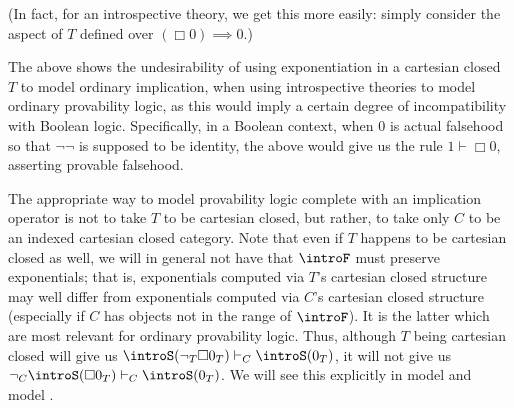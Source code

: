 (In fact, for an introspective theory, we get this more easily: simply consider the aspect of $T$ defined over $(\Box 0) \implies 0$.)

The above shows the undesirability of using exponentiation in a cartesian closed $T$ to model ordinary implication, when using introspective theories to model ordinary provability logic, as this would imply a certain degree of incompatibility with Boolean logic. Specifically, in a Boolean context, when $0$ is actual falsehood so that $\neg \neg$ is supposed to be identity, the above would give us the rule $1 \vdash \Box 0$, asserting provable falsehood.

The appropriate way to model provability logic complete with an implication operator is not to take $T$ to be cartesian closed, but rather, to take only $C$ to be an indexed cartesian closed category. Note that even if $T$ happens to be cartesian closed as well, we will in general not have that $\introF$ must preserve exponentials; that is, exponentials computed via $T$'s cartesian closed structure may well differ from exponentials computed via $C$'s cartesian closed structure (especially  if $C$ has objects not in the range of $\introF$). It is the latter which are most relevant for ordinary provability logic. Thus, although $T$ being cartesian closed will give us $\introS(\neg_T \Box 0_T) \vdash_C \introS(0_T)$, it will not give us $\neg_C \introS(\Box 0_T) \vdash_C \introS(0_T)$. We will see this explicitly in model \TODO and model \TODO.


